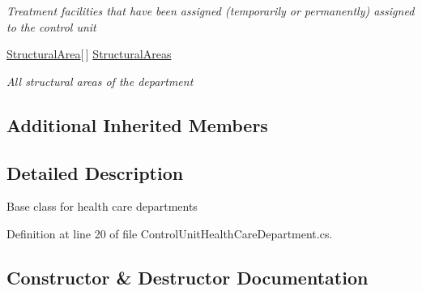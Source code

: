 \begin{DoxyCompactItemize}
\begin{DoxyCompactList}\small\item\em Treatment facilities that have been assigned (temporarily or permanently) assigned to the control unit \end{DoxyCompactList}\item 
\hyperlink{class_general_health_care_elements_1_1_resource_handling_1_1_structural_area}{Structural\+Area}\mbox{[}$\,$\mbox{]} \hyperlink{class_general_health_care_elements_1_1_control_units_1_1_control_unit_health_care_department_a688b2a2c255cf90d8687e988637bdf39}{Structural\+Areas}
\begin{DoxyCompactList}\small\item\em All structural areas of the department \end{DoxyCompactList}\end{DoxyCompactItemize}
\subsection*{Additional Inherited Members}


\subsection{Detailed Description}
Base class for health care departments 



Definition at line 20 of file Control\+Unit\+Health\+Care\+Department.\+cs.



\subsection{Constructor \& Destructor Documentation}
